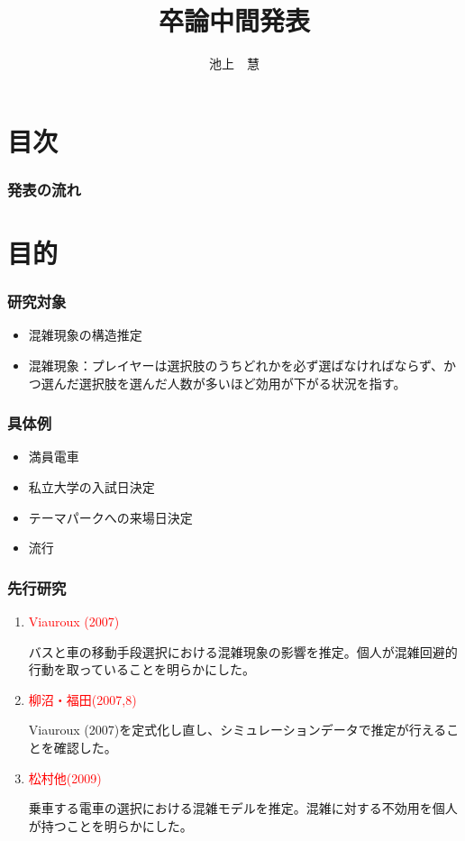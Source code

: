 \documentclass[dvipdfmx, 12pt]{beamer}
\title{卒論中間発表}
\author{池上　慧}
\begin{document}
\newcommand{\argmin}{\mathop{\rm arg~min}\limits}

\frame{\maketitle}

\section*{目次}
\begin{frame} \frametitle{発表の流れ}
\tableofcontents
\end{frame}

\section{目的}
\begin{frame}\frametitle{研究対象}
	\begin{itemize}
		\item 混雑現象の構造推定
		\item 混雑現象：プレイヤーは選択肢のうちどれかを必ず選ばなければならず、かつ選んだ選択肢を選んだ人数が多いほど効用が下がる状況を指す。
	\end{itemize}
\end{frame}

\begin{frame}\frametitle{具体例}
	\begin{itemize}
		\item 満員電車
		\item 私立大学の入試日決定
		\item テーマパークへの来場日決定
		\item 流行
	\end{itemize}
\end{frame}

\begin{frame}\frametitle{先行研究}
	\begin{enumerate}
		\item \textcolor{red}{Viauroux (2007)}
		
		バスと車の移動手段選択における混雑現象の影響を推定。個人が混雑回避的行動を取っていることを明らかにした。
		\item \textcolor{red}{柳沼・福田(2007,8)}
		
		Viauroux (2007)を定式化し直し、シミュレーションデータで推定が行えることを確認した。
		\item \textcolor{red}{松村他(2009)}
		
		乗車する電車の選択における混雑モデルを推定。混雑に対する不効用を個人が持つことを明らかにした。
	\end{enumerate}
\end{frame}
\end{document}
